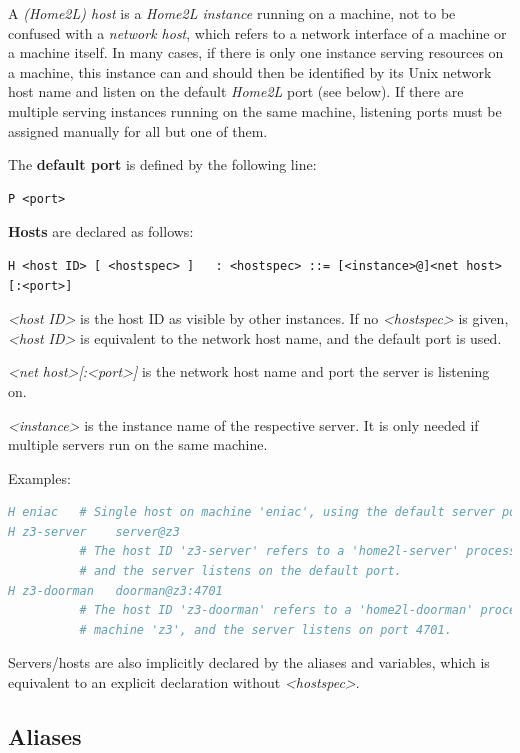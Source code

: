 \documentclass[12pt,english,parskip=half,headheight=19pt]{scrreprt}
\begin{document}
A \textit{(Home2L) host} is a \textit{Home2L instance} running on a machine, not to be confused with a \textit{network host}, which refers to a network interface of a machine or a machine itself. In many cases, if there is only one instance serving resources on a machine, this instance can and should then be identified by its Unix network host name and listen on the default \textit{Home2L} port (see below). If there are multiple serving instances running on the same machine, listening ports must be assigned manually for all but one of them.

The \textbf{default port} is defined by the following line:
\begin{lstlisting}
P <port>
\end{lstlisting}

\textbf{Hosts} are declared as follows:
\begin{lstlisting}
H <host ID> [ <hostspec> ]   : <hostspec> ::= [<instance>@]<net host>[:<port>]
\end{lstlisting}

\textit{<host ID>} is the host ID as visible by other instances.
If no \textit{<hostspec>} is given, \textit{<host ID>} is equivalent to the network host name,
and the default port is used.

\textit{<net host>[:<port>]} is the network host name and port the server is listening on.

\textit{<instance>} is the instance name of the respective server. It is only needed
if multiple servers run on the same machine.

Examples:
\begin{lstlisting}[language=comments]
H eniac   # Single host on machine 'eniac', using the default server port.
H z3-server    server@z3
          # The host ID 'z3-server' refers to a 'home2l-server' process on machine 'z3',
          # and the server listens on the default port.
H z3-doorman   doorman@z3:4701
          # The host ID 'z3-doorman' refers to a 'home2l-doorman' process on
          # machine 'z3', and the server listens on port 4701.
\end{lstlisting}

Servers/hosts are also implicitly declared by the aliases and variables, which is equivalent to an explicit declaration without \textit{<hostspec>}.


\subsection{Aliases}
\label{sec:resources-aliases}
\end{document}
